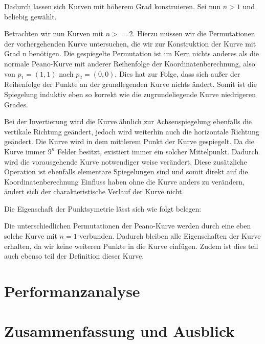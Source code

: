 \documentclass[course=asp]{aspdoc}
\begin{document}
Dadurch lassen sich Kurven mit höherem Grad konstruieren. Sei nun $n>1$ und beliebig gewählt.

Betrachten wir nun Kurven mit $n>=2$. Hierzu müssen wir die Permutationen der vorhergehenden Kurve untersuchen, die wir zur Konstruktion der Kurve mit Grad n benötigen.	%
Die gespiegelte Permutation ist im Kern nichts anderes als die normale Peano-Kurve mit anderer Reihenfolge der Koordinatenberechnung, also von $p_1=(1,1)$ nach $p_2 = (0,0)$. Dies hat zur Folge, dass sich außer der Reihenfolge der Punkte an der grundlegenden Kurve nichts ändert. Somit ist die Spiegelung induktiv eben so korrekt wie die zugrundeliegende Kurve niedrigeren Grades.

Bei der Invertierung wird die Kurve ähnlich zur Achsenspiegelung ebenfalls die vertikale Richtung geändert, jedoch wird weiterhin auch die horizontale Richtung geändert. Die Kurve wird in dem mittlerem Punkt der Kurve gespiegelt. Da die Kurve immer $9^n$ Felder besitzt, existiert immer ein solcher Mittelpunkt. Dadurch wird die vorausgehende Kurve notwendiger weise verändert.  Diese zusätzliche Operation ist ebenfalls elementare Spiegelungen sind und somit direkt auf die Koordinatenberechnung Einfluss haben ohne die Kurve anders zu verändern, ändert sich der charakteristische Verlauf der Kurve nicht.

Die Eigenschaft der Punktsymetrie lässt sich wie folgt belegen: 

Die unterschiedlichen Permutationen der Peano-Kurve werden durch eine eben solche Kurve mit $n = 1$ verbunden. Dadurch bleiben alle Eigenschaften der Kurve erhalten, da wir keine weiteren Punkte in die Kurve einfügen. Zudem ist dies teil auch ebenso teil der Definition dieser Kurve. 

\newpage
\section{Performanzanalyse}

\newpage
\section{Zusammenfassung und Ausblick}


{}
\end{document}
